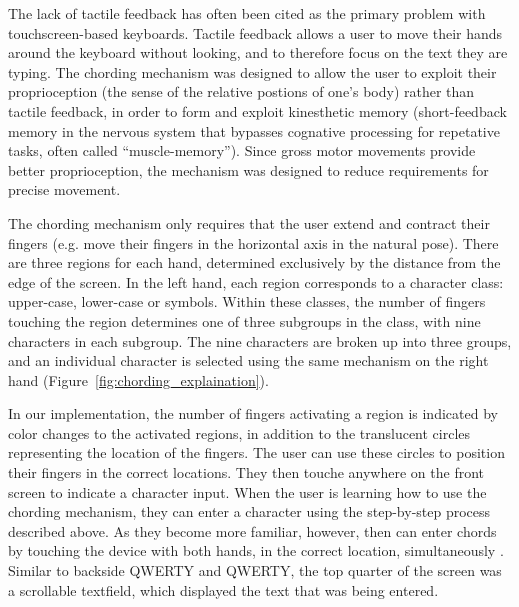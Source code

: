 The lack of tactile feedback has often been cited as the primary
problem with touchscreen-based keyboards.  Tactile feedback allows a
user to move their hands around the keyboard without looking, and to
therefore focus on the text they are typing.  The chording mechanism
was designed to allow the user to exploit their proprioception (the
sense of the relative postions of one's body) rather than tactile
feedback, in order to form and exploit kinesthetic memory
(short-feedback memory in the nervous system that bypasses cognative
processing for repetative tasks, often called ``muscle-memory'').
Since gross motor movements provide better proprioception, the
mechanism was designed to reduce requirements for precise movement.

The chording mechanism only requires that the user extend and contract
their fingers (e.g. move their fingers in the horizontal axis in the
natural pose).  There are three regions for each hand, determined
exclusively by the distance from the edge of the screen.  In the left
hand, each region corresponds to a character class: upper-case,
lower-case or symbols.  Within these classes, the number of fingers
touching the region determines one of three subgroups in the class,
with nine characters in each subgroup.  The nine characters are broken
up into three groups, and an individual character is selected using
the same mechanism on the right hand
(Figure~\ref{fig:chording_explaination}).

In our implementation, the number of fingers activating a region is
indicated by color changes to the activated regions, in addition to
the translucent circles representing the location of the fingers.
The user can use these circles to position their fingers in the correct
locations.  They then touche anywhere on the front screen to
indicate a character input.  When the user is learning how to use the
chording mechanism, they can enter a character using the step-by-step
process described above.  As they become more familiar, however, then
can enter chords by touching the device with both hands, in the
correct location, simultaneously
.
Similar to backside QWERTY and QWERTY, the top quarter of the screen
was a scrollable textfield, which displayed the text that was being
entered.

